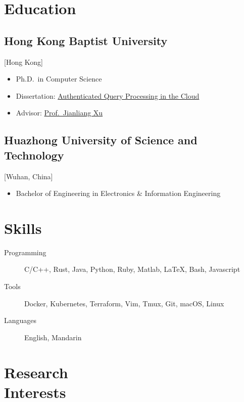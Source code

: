 \documentclass{mycv}
\begin{document}
\section{Education}

\subsection{Hong Kong Baptist University}[Hong Kong]
\vspace{-\parskip}%
\begin{itemize}[label={}]
  \item Ph.D.\ in Computer Science 
  \item Dissertation: \href{https://scholars.hkbu.edu.hk/en/studentTheses/authenticated-query-processing-in-the-cloud}{Authenticated Query Processing in the Cloud}
  \item Advisor: \href{https://www.comp.hkbu.edu.hk/~xujl}{Prof.~Jianliang Xu}
\end{itemize}

\subsection{Huazhong University of Science and Technology}[Wuhan, China]
\vspace{-\parskip}%
\begin{itemize}[label={}]
  \item Bachelor of Engineering in Electronics \& Information Engineering 
\end{itemize}

\section{Skills}

\begin{description}
  \item[Programming] C/C++, Rust, Java, Python, Ruby, Matlab, \LaTeX, Bash, Javascript
  \item[Tools] Docker, Kubernetes, Terraform, Vim, Tmux, Git, macOS, Linux
  \item[Languages] English, Mandarin
\end{description}

\section{Research \\ Interests}
\end{document}
